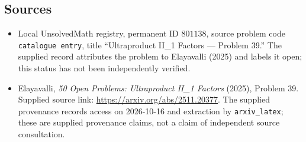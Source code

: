 \documentclass[11pt]{article}
\begin{document}
\subsection{Sources}
\begin{itemize}
\item Local UnsolvedMath registry, permanent ID \(801138\), source problem code \texttt{catalogue entry}, title ``Ultraproduct II\_1 Factors --- Problem 39.'' The supplied record attributes the problem to Elayavalli (2025) and labels it open; this status has not been independently verified.
\item Elayavalli, \emph{50 Open Problems: Ultraproduct II\_1 Factors} (2025), Problem 39. Supplied source link: \url{https://arxiv.org/abs/2511.20377}. The supplied provenance records access on 2026-10-16 and extraction by \texttt{arxiv\_latex}; these are supplied provenance claims, not a claim of independent source consultation.
\end{itemize}
\end{document}
